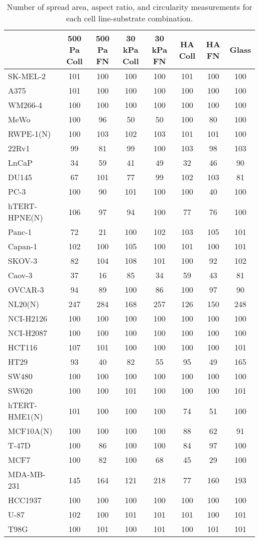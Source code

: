 \begin{table}[!h]
\centering
\caption{\label{tab:count-area}Number of spread area, aspect ratio, and circularity measurements for each cell line-substrate combination.}
\centering
\begin{tabular}[t]{lccccccc}
\toprule
  & 500 Pa Coll & 500 Pa FN & 30 kPa Coll & 30 kPa FN & HA Coll & HA FN & Glass\\
\midrule
SK-MEL-2 & 101 & 100 & 100 & 100 & 101 & 100 & 100\\
A375 & 101 & 100 & 100 & 100 & 100 & 100 & 100\\
WM266-4 & 100 & 100 & 100 & 100 & 100 & 100 & 100\\
MeWo & 100 & 96 & 50 & 50 & 100 & 80 & 100\\
RWPE-1(N) & 100 & 103 & 102 & 103 & 101 & 101 & 100\\
22Rv1 & 99 & 81 & 99 & 100 & 103 & 98 & 103\\
LnCaP & 34 & 59 & 41 & 49 & 32 & 46 & 90\\
DU145 & 67 & 101 & 77 & 99 & 102 & 103 & 81\\
PC-3 & 100 & 90 & 101 & 100 & 100 & 40 & 100\\
hTERT-HPNE(N) & 106 & 97 & 94 & 100 & 77 & 76 & 100\\
Panc-1 & 72 & 21 & 100 & 102 & 103 & 105 & 101\\
Capan-1 & 102 & 100 & 105 & 100 & 101 & 100 & 101\\
SKOV-3 & 82 & 104 & 108 & 101 & 100 & 92 & 102\\
Caov-3 & 37 & 16 & 85 & 34 & 59 & 43 & 81\\
OVCAR-3 & 94 & 89 & 100 & 86 & 100 & 97 & 90\\
NL20(N) & 247 & 284 & 168 & 257 & 126 & 150 & 248\\
NCI-H2126 & 100 & 100 & 100 & 100 & 100 & 100 & 100\\
NCI-H2087 & 100 & 100 & 100 & 100 & 100 & 100 & 100\\
HCT116 & 107 & 101 & 100 & 100 & 100 & 100 & 101\\
HT29 & 93 & 40 & 82 & 55 & 95 & 49 & 165\\
SW480 & 100 & 100 & 100 & 100 & 100 & 100 & 100\\
SW620 & 100 & 100 & 101 & 100 & 100 & 100 & 101\\
hTERT-HME1(N) & 101 & 100 & 100 & 100 & 74 & 51 & 100\\
MCF10A(N) & 100 & 100 & 100 & 100 & 88 & 62 & 91\\
T-47D & 100 & 86 & 100 & 100 & 84 & 97 & 100\\
MCF7 & 100 & 82 & 100 & 68 & 45 & 29 & 100\\
MDA-MB-231 & 145 & 164 & 121 & 218 & 77 & 160 & 193\\
HCC1937 & 100 & 100 & 100 & 100 & 100 & 100 & 100\\
U-87 & 102 & 100 & 101 & 101 & 101 & 100 & 101\\
T98G & 100 & 101 & 100 & 101 & 100 & 101 & 101\\
\bottomrule
\end{tabular}
\end{table}
